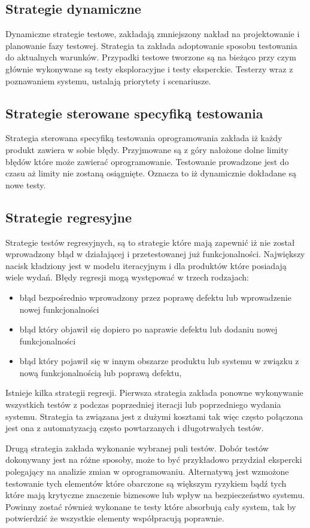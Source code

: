 \subsection{Strategie dynamiczne}
Dynamiczne strategie testowe, zakładają zmniejszony nakład na projektowanie i planowanie fazy testowej. Strategia ta zakłada adoptowanie sposobu testowania do aktualnych warunków. Przypadki testowe tworzone są na bieżąco przy czym głównie wykonywane są testy eksploracyjne i testy eksperckie. Testerzy wraz z poznawaniem systemu, ustalają priorytety i scenariusze.
\subsection{Strategie sterowane specyfiką testowania}
Strategia sterowana specyfiką testowania oprogramowania zakłada iż każdy produkt zawiera w sobie błędy. Przyjmowane są z góry nałożone dolne limity błędów które może zawierać oprogramowanie. Testowanie prowadzone jest do czasu aż limity nie zostaną osiągnięte. Oznacza to iż dynamicznie dokładane są nowe testy.
\subsection{Strategie regresyjne}
Strategie testów regresyjnych, są to strategie które mają zapewnić iż nie został wprowadzony błąd w działającej i przetestowanej już funkcjonalności. Największy nacisk kładziony jest w modelu iteracyjnym i dla produktów które posiadają wiele wydań. Błędy regresji mogą występować w trzech rodzajach:
\begin{itemize}
  \item błąd bezpośrednio wprowadzony przez poprawę defektu lub wprowadzenie nowej funkcjonalności
  \item błąd który objawił się dopiero po naprawie defektu lub dodaniu nowej funkcjonalności
  \item  błąd który pojawił się w innym obszarze produktu lub systemu w związku z nową funkcjonalnością lub poprawą defektu,
\end{itemize}


Istnieje kilka strategii regresji. Pierwsza strategia zakłada ponowne wykonywanie wszystkich testów z podczas poprzedniej iteracji lub poprzedniego wydania systemu. Strategia ta związana jest z dużymi kosztami tak więc często połączona jest ona z automatyzacją często powtarzanych i długotrwałych testów. 

Drugą strategia zakłada wykonanie wybranej puli testów. Dobór testów dokonywany jest na różne sposoby, może to być przykładowo przydział ekspercki polegający na analizie zmian w oprogramowaniu. Alternatywą jest wzmożone testowanie tych elementów które obarczone są większym ryzykiem bądź tych które mają krytyczne znaczenie biznesowe lub wpływ na bezpieczeństwo systemu. Powinny zostać również wykonane te testy które absorbują cały system, tak by potwierdzić że wszystkie elementy współpracują poprawnie.

